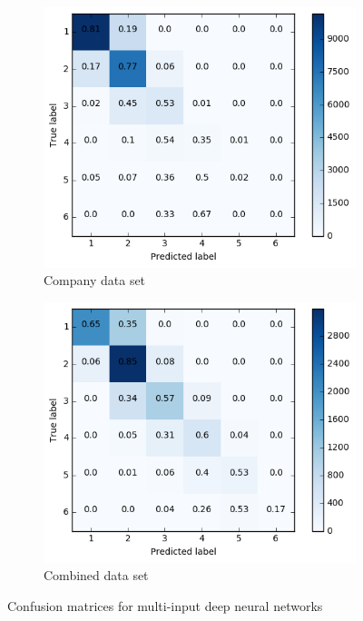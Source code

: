 \begin{figure}[h]
\begin{subfigure}{.5\textwidth}
  \includegraphics[width=.95\linewidth]{img/corp_d2_cm_retweets}
  \caption{Company data set}
  \label{fig:retw_distr_sub3}
\end{subfigure}%
\begin{subfigure}{.5\textwidth}
  \includegraphics[width=.95\linewidth]{img/comb_d2_cm_retweets}
  \caption{Combined data set}
  \label{fig:retw_distr_sub4}
\end{subfigure}%
\caption{Confusion matrices for multi-input deep neural networks}
\label{fig:d2_cm}
\end{figure}

